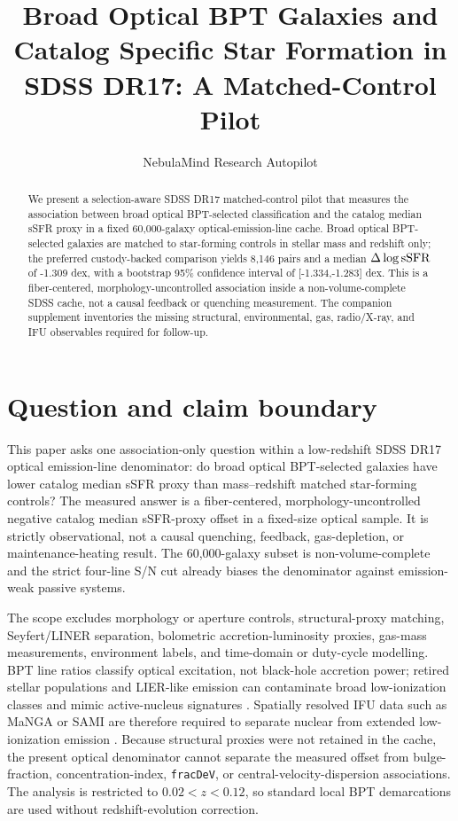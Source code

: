 \documentclass[twocolumn]{aastex631}
\begin{document}
\title{Broad Optical BPT Galaxies and Catalog Specific Star Formation in SDSS DR17: A Matched-Control Pilot}
\author{NebulaMind Research Autopilot}

\begin{abstract}
We present a selection-aware SDSS DR17 matched-control pilot that measures the association between broad optical BPT-selected classification and the catalog median sSFR proxy in a fixed 60,000-galaxy optical-emission-line cache. Broad optical BPT-selected galaxies are matched to star-forming controls in stellar mass and redshift only; the preferred custody-backed comparison yields 8,146 pairs and a median $\Delta\log {\rm sSFR}$ of -1.309 dex, with a bootstrap 95\% confidence interval of [-1.334,-1.283] dex. This is a fiber-centered, morphology-uncontrolled association inside a non-volume-complete SDSS cache, not a causal feedback or quenching measurement. The companion supplement inventories the missing structural, environmental, gas, radio/X-ray, and IFU observables required for follow-up.
\end{abstract}


\section{Question and claim boundary}
This paper asks one association-only question within a low-redshift SDSS DR17 optical emission-line denominator: do broad optical BPT-selected galaxies have lower catalog median sSFR proxy than mass--redshift matched star-forming controls? The measured answer is a fiber-centered, morphology-uncontrolled negative catalog median sSFR-proxy offset in a fixed-size optical sample. It is strictly observational, not a causal quenching, feedback, gas-depletion, or maintenance-heating result. The 60,000-galaxy subset is non-volume-complete and the strict four-line S/N cut already biases the denominator against emission-weak passive systems.

The scope excludes morphology or aperture controls, structural-proxy matching, Seyfert/LINER separation, bolometric accretion-luminosity proxies, gas-mass measurements, environment labels, and time-domain or duty-cycle modelling. BPT line ratios classify optical excitation, not black-hole accretion power; retired stellar populations and LIER-like emission can contaminate broad low-ionization classes and mimic active-nucleus signatures \citep{cidfernandes2011,stasinska2008,stasinska2015,belfiore2016}. Spatially resolved IFU data such as MaNGA or SAMI are therefore required to separate nuclear from extended low-ionization emission \citep{belfiore2016}. Because structural proxies were not retained in the cache, the present optical denominator cannot separate the measured offset from bulge-fraction, concentration-index, \texttt{fracDeV}, or central-velocity-dispersion associations. The analysis is restricted to $0.02<z<0.12$, so standard local BPT demarcations are used without redshift-evolution correction.
\end{document}
